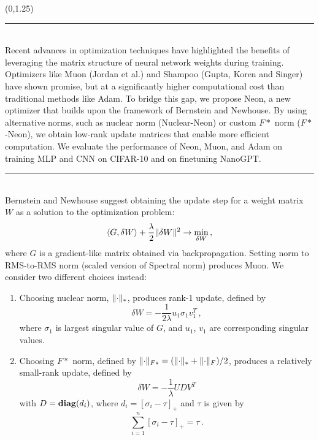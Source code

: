 \documentclass[a1]{a1poster}
\def\Head#1{\noindent{\LARGE\color{bluegray} #1}\bigskip}
\begin{document}
\begin{textblock}{7.0}(0,1.25)

\hrule\medskip
\Head{Introduction}\\
Recent advances in optimization techniques have highlighted the benefits of leveraging the matrix structure of neural network weights during training. Optimizers like Muon (Jordan et al.) and Shampoo (Gupta, Koren and Singer) have shown promise, but at a significantly higher computational cost than traditional methods like Adam. To bridge this gap, we propose Neon, a new optimizer that builds upon the framework of Bernstein and Newhouse. By using alternative norms, such as nuclear norm (Nuclear-Neon) or custom $F*$ norm ($F*$-Neon), we obtain low-rank update matrices that enable more efficient computation. We evaluate the performance of Neon, Muon, and Adam on training MLP and CNN on CIFAR-10 and on finetuning NanoGPT.

\medskip
\hrule\medskip
\Head{Neon's update rule}\\
Bernstein and Newhouse suggest obtaining the update step for a weight matrix $W$ as a solution to the optimization problem:
\begin{equation}
    \langle G, \delta W \rangle + \frac{\lambda}{2} \Vert{\delta W}\Vert^2 \to \min_{\delta W}\,,
\end{equation}
where $G$ is a gradient-like matrix obtained via backpropagation. Setting norm to RMS-to-RMS norm (scaled version of Spectral norm) produces Muon. We consider two different choices instead:
\begin{enumerate}
    \item Choosing nuclear norm, $\Vert{\cdot}\Vert_*$, produces rank-1 update, defined by 
    \begin{equation}\label{eqn:update_star}
        \delta W = -\frac{1}{2\lambda} u_1 \sigma_1 v_1^T\,,
    \end{equation}
    where $\sigma_1$ is largest singular value of $G$, and $u_1$, $v_1$ are corresponding singular values.

    \item Choosing $F*$ norm, defined by $\Vert{\cdot}\Vert_{F*} = (\Vert{\cdot}\Vert_{*} + \Vert{\cdot}\Vert_{F})/2$, produces a relatively small-rank update, defined by
    \begin{equation}\label{eqn:update_F_star}
    \delta W = -\frac{1}{\lambda}UDV^T
    \end{equation} 
    with $D = \mathop{\bf diag}(d_i)$, where $d_i = [\sigma_i - \tau]_+$ and $\tau$ is given by
    \begin{equation*}
        \sum_{i=1}^n [\sigma_i - \tau]_+ = \tau\,.
    \end{equation*}
\end{enumerate}


\end{textblock}
\end{document}

